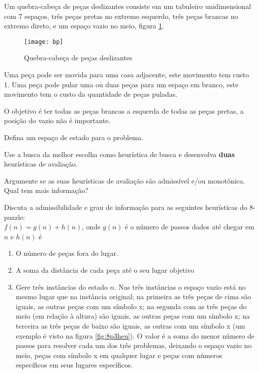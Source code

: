 \documentclass[12pt]{exam}
\begin{document}
\break

\begin{questions}


\question Um quebra-cabeça de peças deslizantes consiste em um tabuleiro unidimensional com 7 espaços, três peças pretas no extremo esquerdo, três peças brancas no extremo direto, e um espaço vazio no meio, figura \ref{fig:bp}.

\begin{figure}[h]
    \centering
    \texttt{[image: bp]}
    \caption{Quebra-cabeça de peças deslizantes}
    \label{fig:bp}
\end{figure}

Uma peça pode ser movida para uma casa adjacente, este movimento tem custo 1. Uma peça pode pular uma ou duas peças para um espaço em branco, este movimento tem o custo da quantidade de peças puladas.

O objetivo é ter todas as peças brancas a esquerda de todas as peças pretas, a posição do vazio não é importante.

Defina um espaço de estado para o problema.

Use a busca da melhor escolha como heurística de busca e desenvolva \textbf{duas} heurísticas de avaliação.

Argumente se as suas heurísticas de avaliação são admissível e/ou monotônica. Qual tem mais informação?

\break

\question Discuta a admissibilidade
e grau de informação para as seguintes heurísticas do 8-puzzle:\\
$f(n) = g(n)+h(n)$, onde $g(n)$ é o número de passos dados até chegar em $n$ e $h(n)$ é

\begin{enumerate}
\item O número de peças fora do lugar.
\item A soma da distância de cada peça até o seu lugar objetivo
\item Gere três instâncias do estado $n$. Nas três instâncias o espaço vazio está no mesmo lugar que na instância original; na primeira as três peças de cima são iguais, as outras peças com um símbolo x; na segunda com as três peças do meio (em relação à altura) são iguais, as outras peças com um símbolo x; na terceira as três peças de baixo são iguais, as outras com um símbolo x (um exemplo é visto na figura \ref{fig:8p3heu}). O valor é a soma do menor número de passos para resolver cada um dos três problemas, deixando o espaço vazio no meio, peças com símbolo x em qualquer lugar e peças com números específicos em seus lugares específicos.
\end{enumerate}


\end{questions}
\end{document}
